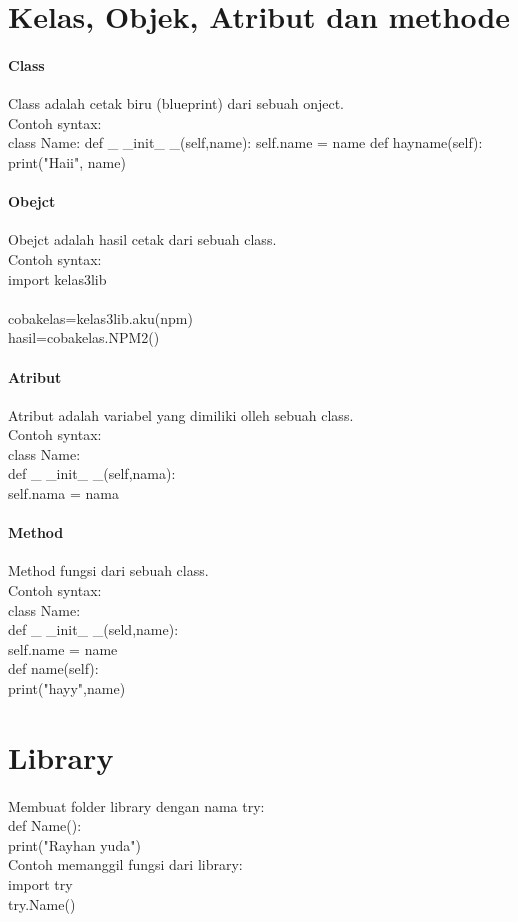 \documentclass[a4paper,12pt]{report}
\begin{document}
\section*{Kelas, Objek, Atribut dan methode}
\paragraph{Class}
Class adalah cetak biru (blueprint) dari sebuah onject.\\
Contoh syntax:\\
class Name:
	def \_ \_init\_ \_(self,name):
		self.name = name
	def hayname(self):
		print("Haii", name)	
\paragraph{Obejct}
Obejct adalah hasil cetak dari sebuah class.\\
Contoh syntax:\\
import kelas3lib\\
\\
cobakelas=kelas3lib.aku(npm)\\
hasil=cobakelas.NPM2()\\
\paragraph{Atribut}
Atribut adalah variabel yang dimiliki olleh sebuah class.\\
Contoh syntax:\\
class Name:\\
def \_ \_init\_ \_(self,nama):\\
		self.nama = nama\\
\paragraph{Method}
Method fungsi dari sebuah class.\\
Contoh syntax:\\
class Name:\\
	def \_ \_init\_ \_(seld,name):\\
		self.name = name\\
	def name(self):\\
		print("hayy",name)\\
\section*{Library}
\paragraph{}
Membuat folder library dengan nama try:\\
def Name():\\
	print("Rayhan yuda")\\
Contoh memanggil fungsi dari library:\\
import try\\
try.Name()\\
\end{document}
